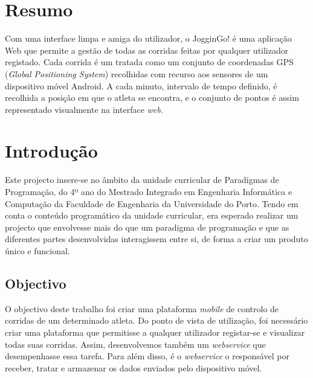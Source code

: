 \documentclass[15pt,a4paper]{article}
\begin{document}
\newpage

\tableofcontents



\newpage

\section{Resumo}

Com uma interface limpa e amiga do utilizador, o JogginGo! é uma aplicação Web que permite a gestão de todas as corridas feitas por qualquer utilizador registado. Cada corrida é um tratada como um conjunto de coordenadas GPS (\textit{Global Positioning System}) recolhidas com recurso aos sensores de um dispositivo móvel Android. A cada minuto, intervalo de tempo definido, é recolhida a posição em que o atleta se encontra, e o conjunto de pontos é assim representado visualmente na interface \textit{web}. 

\newpage
\section{Introdução}

Este projecto insere-se no âmbito da unidade curricular de Paradigmas de Programação, do 4º ano do Mestrado Integrado em Engenharia Informática e Computação da Faculdade de Engenharia da Universidade do Porto. Tendo em conta o conteúdo programático da unidade curricular, era esperado realizar um projecto que envolvesse mais do que um paradigma de programação e que as diferentes partes desenvolvidas interagissem entre si, de forma a criar um produto único e funcional.

\subsection{Objectivo}

O objectivo deste trabalho foi criar uma plataforma \textit{mobile} de controlo de corridas de um determinado atleta. Do ponto de vista de utilização, foi necessário criar uma plataforma que permitisse a qualquer utilizador registar-se e visualizar todas suas corridas. Assim, desenvolvemos também um \textit{webservice} que desempenhasse essa tarefa. Para além disso, é o \textit{webservice} o responsável por receber, tratar e armazenar os dados enviados pelo dispositivo móvel.
\end{document}
